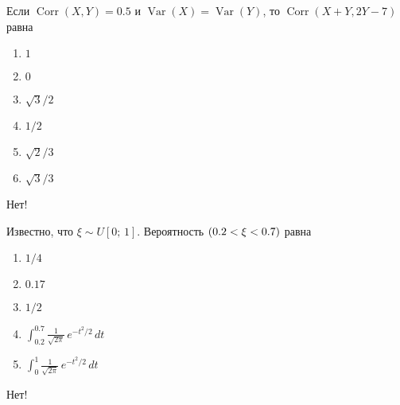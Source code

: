 \documentclass[t]{beamer}
\DeclareMathOperator{\Var}{Var}
\DeclareMathOperator{\Corr}{Corr}
\let\P\relax
\DeclareMathOperator{\P}{\mathbb{P}}
\begin{document}
 \begin{frame} \label{15-No} 
\begin{block}{15} 

  Если $\Corr(X, Y)= 0.5$ и $\Var(X)=\Var(Y)$, то $\Corr(X + Y, 2Y - 7)$ равна
  


 \end{block} 
\begin{enumerate} 
\item[] \hyperlink{15-No}{\beamergotobutton{} $1$}
\item[] \hyperlink{15-No}{\beamergotobutton{} $0$}
\item[] \hyperlink{15-Yes}{\beamergotobutton{} $\sqrt{3}/2$}
\item[] \hyperlink{15-No}{\beamergotobutton{} $1/2$}
\item[] \hyperlink{15-No}{\beamergotobutton{} $\sqrt{2}/3$}
\item[] \hyperlink{15-No}{\beamergotobutton{} $\sqrt{3}/3$}
\end{enumerate} 

 \alert{Нет!} 
\end{frame} 


 \begin{frame} \label{16-No} 
\begin{block}{16} 

  Известно, что $\xi \sim U[0;\,1]$. Вероятность $\P(0.2<\xi<0.7)$ равна
  


 \end{block} 
\begin{enumerate} 
\item[] \hyperlink{16-No}{\beamergotobutton{} $1/4$}
\item[] \hyperlink{16-No}{\beamergotobutton{} $0.17$}
\item[] \hyperlink{16-Yes}{\beamergotobutton{} $1/2$}
\item[] \hyperlink{16-No}{\beamergotobutton{} $\int_{0.2}^{0.7}\frac{1}{\sqrt{2\pi}}\,e^{-t^2/2}\,dt$}
\item[] \hyperlink{16-No}{\beamergotobutton{} $\int_{0}^{1}\frac{1}{\sqrt{2\pi}}\,e^{-t^2/2}\,dt$}
\end{enumerate} 

 \alert{Нет!} 
\end{frame} 
\end{document}
